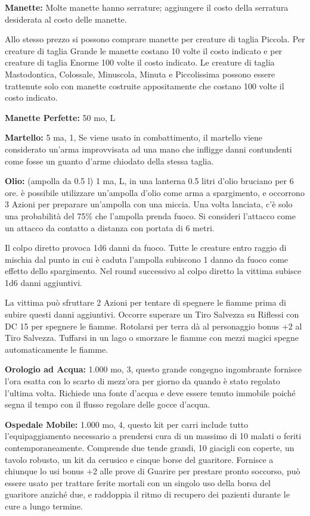 \documentclass[a4paper,11pt,twoside,openany]{book}
\begin{document}
{\textbf{Manette:} Molte manette hanno serrature; aggiungere il costo della serratura desiderata al costo delle manette.

Allo stesso prezzo si possono comprare manette per creature di taglia Piccola. Per creature di taglia Grande le manette costano 10 volte il costo indicato e per creature di taglia Enorme 100 volte il costo indicato. Le creature di taglia Mastodontica, Colossale, Minuscola, Minuta e Piccolissima possono essere trattenute solo con manette costruite appositamente che costano 100 volte il costo indicato.

\textbf{Manette Perfette:} 50 mo, L

\textbf{Martello:} 5 ma, 1, Se viene usato in combattimento, il martello viene considerato un'arma improvvisata ad una mano che infligge danni contundenti come fosse un guanto d'arme chiodato della stessa taglia.

\textbf{Olio:} (ampolla da 0.5 l) 1 ma, L, in una lanterna 0.5 litri d'olio bruciano per 6 ore. è possibile utilizzare un'ampolla d'olio come arma a spargimento, e occorrono 3 Azioni per preparare un'ampolla con una miccia. Una volta lanciata, c'è solo una probabilità del 75\% che l'ampolla prenda fuoco. Si consideri l'attacco come un attacco da contatto a distanza con portata di 6 metri.

Il colpo diretto provoca 1d6 danni da fuoco. Tutte le creature entro raggio di mischia dal punto in cui è caduta l'ampolla subiscono 1 danno da fuoco come effetto dello spargimento. Nel round successivo al colpo diretto la vittima subisce 1d6 danni aggiuntivi.

La vittima può sfruttare 2 Azioni per tentare di spegnere le fiamme prima di subire questi danni aggiuntivi. Occorre superare un Tiro Salvezza su Riflessi con DC 15 per spegnere le fiamme. Rotolarsi per terra dà al personaggio bonus +2 al Tiro Salvezza. 
Tuffarsi in un lago o smorzare le fiamme con mezzi magici spegne automaticamente le fiamme.

\textbf{Orologio ad Acqua:} 1.000 mo, 3, questo grande congegno ingombrante fornisce l'ora esatta con lo scarto di mezz'ora per giorno da quando è stato regolato l'ultima volta. Richiede una fonte d'acqua e deve essere tenuto immobile poiché segna il tempo con il flusso regolare delle gocce d'acqua.

\textbf{Ospedale Mobile:} 1.000 mo, 4, questo kit per carri include tutto l'equipaggiamento necessario a prendersi cura di un massimo di 10 malati o feriti contemporaneamente. Comprende due tende grandi, 10 giacigli con coperte, un tavolo robusto, un kit da cerusico e cinque borse del guaritore. Fornisce a chiunque lo usi bonus +2 alle prove di Guarire per prestare pronto soccorso, può essere usato per trattare ferite mortali con un singolo uso della borsa del guaritore anziché due, e raddoppia il ritmo di recupero dei pazienti durante le cure a lungo termine.

}
\end{document}
